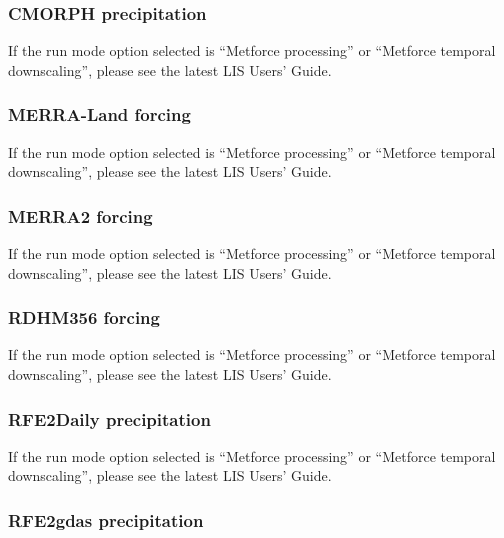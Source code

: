  

 
 \subsubsection{CMORPH precipitation} 

 If the run mode option selected is ``Metforce processing'' or
 ``Metforce temporal downscaling'', please see the latest LIS Users'
 Guide.

 

 
 \subsubsection{MERRA-Land forcing}

 If the run mode option selected is ``Metforce processing'' or
 ``Metforce temporal downscaling'', please see the latest LIS Users'
 Guide.

 

 
 \subsubsection{MERRA2 forcing}

 If the run mode option selected is ``Metforce processing'' or
 ``Metforce temporal downscaling'', please see the latest LIS Users'
 Guide.

 

 
 \subsubsection{RDHM356 forcing} 

 If the run mode option selected is ``Metforce processing'' or
 ``Metforce temporal downscaling'', please see the latest LIS Users'
 Guide.

 

 
 \subsubsection{RFE2Daily precipitation} 

 If the run mode option selected is ``Metforce processing'' or
 ``Metforce temporal downscaling'', please see the latest LIS Users'
 Guide.

 

 
 \subsubsection{RFE2gdas precipitation} 

